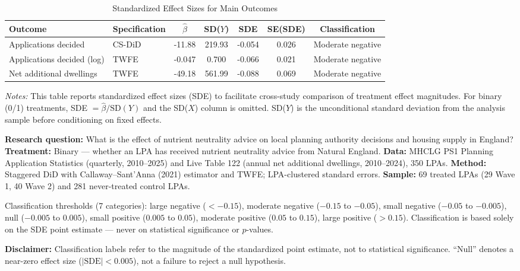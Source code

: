 \begin{table}[H]
\centering
\caption{Standardized Effect Sizes for Main Outcomes}
\label{tab:sde}
\begin{adjustbox}{max width=\textwidth}
\begin{tabular}{llccccc}
\toprule
Outcome & Specification & $\hat{\beta}$ & SD($Y$) & SDE & SE(SDE) & Classification \\
\midrule
Applications decided & CS-DiD & -11.88 & 219.93 & -0.054 & 0.026 & Moderate negative \\
Applications decided (log) & TWFE & -0.047 & 0.700 & -0.066 & 0.021 & Moderate negative \\
Net additional dwellings & TWFE & -49.18 & 561.99 & -0.088 & 0.069 & Moderate negative \\
\bottomrule
\end{tabular}
\end{adjustbox}
\par\vspace{0.3em}
{\footnotesize \emph{Notes:} This table reports standardized effect sizes (SDE) to facilitate cross-study comparison of treatment effect magnitudes. For binary (0/1) treatments, SDE $= \hat{\beta} / \text{SD}(Y)$ and the SD($X$) column is omitted. SD($Y$) is the unconditional standard deviation from the analysis sample before conditioning on fixed effects.

\textbf{Research question:} What is the effect of nutrient neutrality advice on local planning authority decisions and housing supply in England?
\textbf{Treatment:} Binary --- whether an LPA has received nutrient neutrality advice from Natural England.
\textbf{Data:} MHCLG PS1 Planning Application Statistics (quarterly, 2010--2025) and Live Table 122 (annual net additional dwellings, 2010--2024), 350 LPAs.
\textbf{Method:} Staggered DiD with Callaway--Sant'Anna (2021) estimator and TWFE; LPA-clustered standard errors.
\textbf{Sample:} 69 treated LPAs (29 Wave 1, 40 Wave 2) and 281 never-treated control LPAs.

Classification thresholds (7 categories): large negative ($< -0.15$), moderate negative ($-0.15$ to $-0.05$), small negative ($-0.05$ to $-0.005$), null ($-0.005$ to $0.005$), small positive ($0.005$ to $0.05$), moderate positive ($0.05$ to $0.15$), large positive ($> 0.15$). Classification is based solely on the SDE point estimate --- never on statistical significance or $p$-values.

\textbf{Disclaimer:} Classification labels refer to the magnitude of the standardized point estimate, not to statistical significance. ``Null'' denotes a near-zero effect size ($|\text{SDE}| < 0.005$), not a failure to reject a null hypothesis.}
\end{table}

